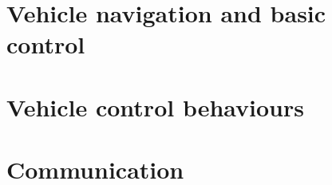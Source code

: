 \documentclass[10pt]{article}
\begin{document}
\maketitle

\tableofcontents

\section{Vehicle navigation and basic control}













\section{Vehicle control behaviours}








\section{Communication}


\end{document}
